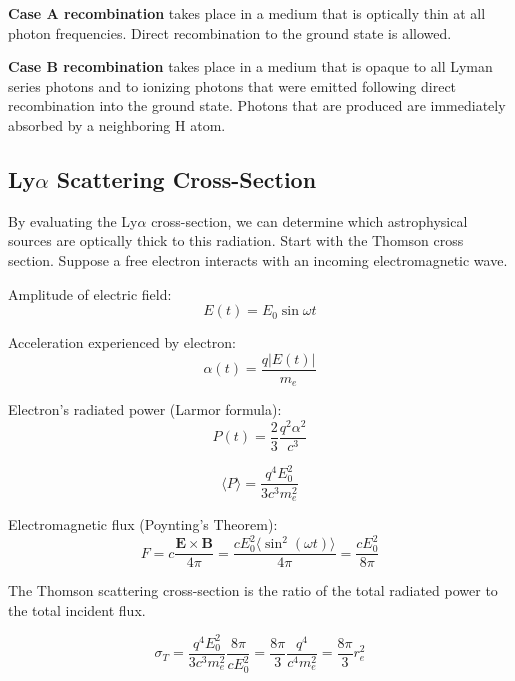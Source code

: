 \documentclass[onecolumn]{aastex63}
\begin{document}
\textbf{Case A recombination} takes place in a medium that is optically thin at all photon frequencies. Direct recombination to the ground state is allowed.

\textbf{Case B recombination} takes place in a medium that is opaque to all Lyman series photons and to ionizing photons that were emitted following direct recombination into the ground state. Photons that are produced are immediately absorbed by a neighboring H atom.

\subsection{Ly$\alpha$ Scattering Cross-Section}

By evaluating the Ly$\alpha$ cross-section, we can determine which astrophysical sources are optically thick to this radiation. Start with the Thomson cross section. Suppose a free electron interacts with an incoming electromagnetic wave. 

\noindent Amplitude of electric field:
\begin{equation}
    E(t) = E_0 \sin{\omega t}
\end{equation}

\noindent Acceleration experienced by electron:
\begin{equation}
    \alpha(t) = \frac{q|E(t)|}{m_e}
\end{equation}

\noindent Electron's radiated power (Larmor formula):
\begin{equation}
    P(t) = \frac{2}{3}\frac{q^2\alpha^2}{c^3}
\end{equation}

\begin{equation}
    \langle P \rangle = \frac{q^4E_0^2}{3c^3m_e^2}
\end{equation}

\noindent Electromagnetic flux (Poynting's Theorem):
\begin{equation}
    F = c\frac{\mathbf{E} \times \mathbf{B}}{4\pi} = \frac{cE_0^2 \langle \sin^2 (\omega t)\rangle}{4\pi} = \frac{cE_0^2}{8\pi}
\end{equation}

\noindent The Thomson scattering cross-section is the ratio of the total radiated power to the total incident flux. 

\begin{equation}
    \sigma_T = \frac{q^4 E_0^2}{3c^3m_e^2} \frac{8\pi}{cE_0^2} = \frac{8\pi}{3}\frac{q^4}{c^4m_e^2} = \frac{8\pi}{3}r_e^2
\end{equation}
\end{document}
